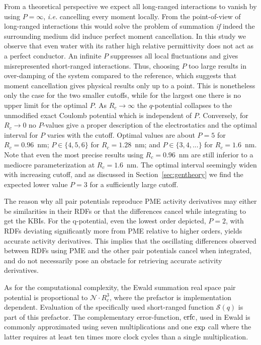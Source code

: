\documentclass[
journal=jctcce,
manuscript=letter]{achemso}
\begin{document}
From a theoretical perspective we expect all long-ranged interactions to vanish by using $P=\infty$, \emph{i.e.} cancelling every moment locally.
From the point-of-view of long-ranged interactions this would solve the problem of summation \emph{if} indeed the surrounding medium did induce perfect moment cancellation.
In this study we observe that even water with its rather high relative permittivity does not act as a perfect conductor.
An infinite $P$ suppresses all local fluctuations and gives misrepresented short-ranged interactions. Thus, choosing $P$ too large results in over-damping of the system compared to the reference, which suggests that moment cancellation gives physical results only up to a point. This is nonetheless only the case for the two smaller cutoffs, while for the largest one there is no upper limit for the optimal $P$.
As $R_c\to\infty$ the $q$-potential collapses to the unmodified exact Coulomb potential which is independent of $P$.
Conversely, for $R_c\to 0$ no $P$-values give a proper description of the electrostatics and the optimal interval for $P$ varies with the cutoff.
Optimal values are about $P=5$ for $R_c=0.96$~nm; $P\in\{4,5,6\}$ for $R_c=1.28$~nm; and $P\in\{3,4,...\}$ for $R_c=1.6$~nm.
Note that even the most precise results using $R_c=0.96$~nm are still inferior to a  mediocre parameterization at $R_c=1.6$~nm.
The optimal interval seemingly widen with increasing cutoff, and as discussed in Section~\ref{sec:gentheory} we find the expected lower value $P=3$ for a sufficiently large cutoff. 

The reason why all pair potentials reproduce PME activity derivatives may either be similarities in their RDFs or that the differences cancel while integrating to get the KBIs. For the q-potential, even the lowest order depicted, $P=2$, with RDFs deviating significantly more from PME relative to higher orders, yields accurate activity derivatives. This implies that the oscillating differences observed between RDFs using PME and the other pair potentials cancel when integrated, and do not necessarily pose an obstacle for retrieving accurate activity derivatives. 

As for the computational complexity, the Ewald summation real space pair potential is proportional to $\mathcal{N}\cdot R_c^3$, where the prefactor is implementation dependent.
Evaluation of the specifically used short-ranged function $\mathcal{S}(q)$ is part of this prefactor.
The complementary error-function, ${\rm erfc}$, used in Ewald is commonly approximated\cite{abramowitz1965handbook} using seven multiplications and one ${\rm exp}$ call where the latter requires at least ten times more clock cycles than a single multiplication.
\end{document}
